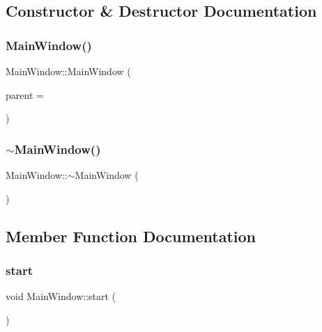 \subsection{Constructor \& Destructor Documentation}
\mbox{\label{class_main_window_a8b244be8b7b7db1b08de2a2acb9409db}} 
\subsubsection{\texorpdfstring{Main\+Window()}{MainWindow()}}
{\footnotesize\ttfamily Main\+Window\+::\+Main\+Window (\begin{DoxyParamCaption}\item[{Q\+Widget $\ast$}]{parent = {} }\end{DoxyParamCaption})\hspace{0.3cm}{\ttfamily [explicit]}}

\mbox{\label{class_main_window_ae98d00a93bc118200eeef9f9bba1dba7}} 
\subsubsection{\texorpdfstring{$\sim$\+Main\+Window()}{~MainWindow()}}
{\footnotesize\ttfamily Main\+Window\+::$\sim$\+Main\+Window (\begin{DoxyParamCaption}{ }\end{DoxyParamCaption})}



\subsection{Member Function Documentation}
\mbox{\label{class_main_window_a5edcbc314e782645cdf4db101eeb247d}} 
\subsubsection{\texorpdfstring{start}{start}}
{\footnotesize\ttfamily void Main\+Window\+::start (\begin{DoxyParamCaption}{ }\end{DoxyParamCaption})\hspace{0.3cm}{\ttfamily [slot]}}



